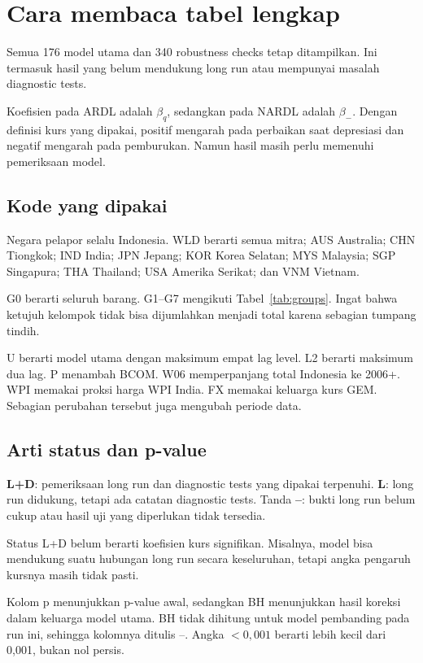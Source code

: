 \section{Cara membaca tabel lengkap}\label{app:read}
Semua 176 model utama dan 340 robustness checks tetap ditampilkan. Ini termasuk hasil yang belum mendukung long run atau mempunyai masalah diagnostic tests.

Koefisien pada ARDL adalah $\beta_q$, sedangkan pada NARDL adalah $\beta_-$. Dengan definisi kurs yang dipakai, positif mengarah pada perbaikan saat depresiasi dan negatif mengarah pada pemburukan. Namun hasil masih perlu memenuhi pemeriksaan model.

\subsection{Kode yang dipakai}
Negara pelapor selalu Indonesia. WLD berarti semua mitra; AUS Australia; CHN Tiongkok; IND India; JPN Jepang; KOR Korea Selatan; MYS Malaysia; SGP Singapura; THA Thailand; USA Amerika Serikat; dan VNM Vietnam.

G0 berarti seluruh barang. G1--G7 mengikuti Tabel~\ref{tab:groups}. Ingat bahwa ketujuh kelompok tidak bisa dijumlahkan menjadi total karena sebagian tumpang tindih.

U berarti model utama dengan maksimum empat lag level. L2 berarti maksimum dua lag. P menambah BCOM. W06 memperpanjang total Indonesia ke 2006+. WPI memakai proksi harga WPI India. FX memakai keluarga kurs GEM. Sebagian perubahan tersebut juga mengubah periode data.

\subsection{Arti status dan p-value}
\textbf{L+D}: pemeriksaan long run dan diagnostic tests yang dipakai terpenuhi. \textbf{L}: long run didukung, tetapi ada catatan diagnostic tests. Tanda \textbf{--}: bukti long run belum cukup atau hasil uji yang diperlukan tidak tersedia.

Status L+D belum berarti koefisien kurs signifikan. Misalnya, model bisa mendukung suatu hubungan long run secara keseluruhan, tetapi angka pengaruh kursnya masih tidak pasti.

Kolom p menunjukkan p-value awal, sedangkan BH menunjukkan hasil koreksi dalam keluarga model utama. BH tidak dihitung untuk model pembanding pada run ini, sehingga kolomnya ditulis --. Angka $<0{,}001$ berarti lebih kecil dari 0,001, bukan nol persis.

